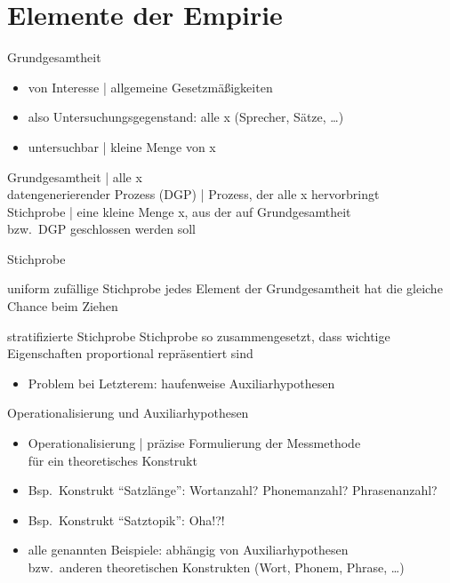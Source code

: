 \section{Elemente der Empirie}

\begin{frame}
  {Grundgesamtheit}
  \begin{itemize}[<+->]
    \item von Interesse | \alert{allgemeine Gesetzmäßigkeiten}
    \item also Untersuchungsgegenstand: \alert{alle x} (Sprecher, Sätze, \dots)
    \item untersuchbar | kleine Menge von x
  \end{itemize}
  \Zeile
  \centering 
  \alert{Grundgesamtheit} | alle x\\
  \Viertelzeile
  \alert{datengenerierender Prozess (DGP)} | Prozess, der \alert{alle x} hervorbringt\\
  \Zeile
  \alert{Stichprobe} | eine kleine Menge x, aus der auf Grundgesamtheit\\
  bzw.\ DGP geschlossen werden soll
\end{frame}

\begin{frame}
  {Stichprobe}
    \begin{block}{uniform zufällige Stichprobe}
      jedes Element der Grundgesamtheit hat die gleiche Chance beim Ziehen
    \end{block}
    \Zeile
    \begin{block}{stratifizierte Stichprobe}
      Stichprobe so zusammengesetzt, dass wichtige Eigenschaften proportional repräsentiert sind
    \end{block}
    \Zeile
  \begin{itemize}
    \item Problem bei Letzterem: haufenweise Auxiliarhypothesen
  \end{itemize}
\end{frame}

\begin{frame}
  {Operationalisierung und Auxiliarhypothesen}
  \begin{itemize}[<+->]
    \item \alert{Operationalisierung} | präzise Formulierung der Messmethode\\
      für ein theoretisches Konstrukt
      \Zeile
    \item Bsp.\ Konstrukt "`Satzlänge"': Wortanzahl? Phonemanzahl? Phrasenanzahl?
    \item Bsp.\ Konstrukt "`Satztopik"': Oha!?! \citep{CookBildhauer2013}
      \Zeile
    \item alle genannten Beispiele: \alert{abhängig von Auxiliarhypothesen}\\
      bzw.\ anderen theoretischen Konstrukten (Wort, Phonem, Phrase, \dots)
  \end{itemize}
\end{frame}

